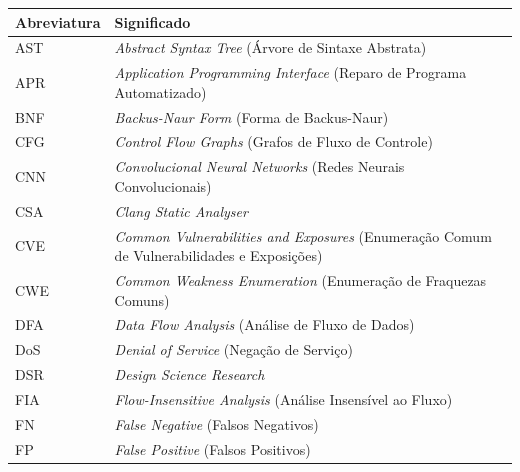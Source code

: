 \documentclass[
    12pt,                %
    openright,           %
    oneside,             %
    a4paper,             %
    english,             %
    brazil               %
]{abntex2}
\begin{document}
\vspace{\onelineskip}
\begin{center}
\begin{tabular}{@{}p{3.2cm}p{}@{}}
\toprule
\textbf{Abreviatura} & \textbf{Significado} \\
\midrule
AST  & \textit{Abstract Syntax Tree} (Árvore de Sintaxe Abstrata) \\
APR  & \textit{Application Programming Interface} (Reparo de Programa Automatizado) \\
BNF  & \textit{Backus-Naur Form} (Forma de Backus-Naur) \\
CFG  & \textit{Control Flow Graphs} (Grafos de Fluxo de Controle) \\
CNN  & \textit{Convolucional Neural Networks} (Redes Neurais Convolucionais) \\
CSA  & \textit{Clang Static Analyser} \\
CVE  & \textit{Common Vulnerabilities and Exposures} (Enumeração Comum de Vulnerabilidades e Exposições)  \\
CWE  & \textit{Common Weakness Enumeration} (Enumeração de Fraquezas Comuns) \\
DFA  & \textit{Data Flow Analysis} (Análise de Fluxo de Dados) \\
DoS  & \textit{Denial of Service} (Negação de Serviço) \\
DSR  & \textit{Design Science Research} \\ 
FIA  & \textit{Flow-Insensitive Analysis} (Análise Insensível ao Fluxo) \\
FN   & \textit{False Negative} (Falsos Negativos) \\
FP   & \textit{False Positive} (Falsos Positivos) \\
\bottomrule
\end{tabular}
\end{center}
\end{document}
